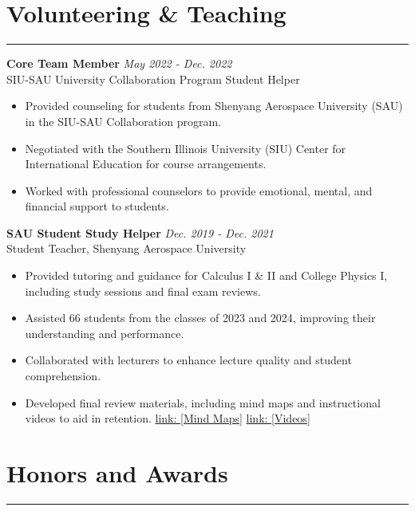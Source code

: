 \documentclass[11pt]{article}
\begin{document}
\section*{Volunteering \& Teaching}
\hrule

\noindent\textbf{Core Team Member} \hfill \textit{May 2022 - Dec. 2022} \\
SIU-SAU University Collaboration Program Student Helper
\begin{itemize}[leftmargin=*,itemsep=1pt]
    \item Provided counseling for students from Shenyang Aerospace University (SAU) in the SIU-SAU Collaboration program.
    \item Negotiated with the Southern Illinois University (SIU) Center for International Education for course arrangements.
    \item Worked with professional counselors to provide emotional, mental, and financial support to students.
\end{itemize}

\vspace{2mm}

\noindent \textbf{SAU Student Study Helper} \hfill \textit{Dec. 2019 - Dec. 2021} \\
Student Teacher, Shenyang Aerospace University 
\begin{itemize}[leftmargin=*,itemsep=1pt] 
    \item Provided tutoring and guidance for Calculus I \& II and College Physics I, including study sessions and final exam reviews.
    \item Assisted 66 students from the classes of 2023 and 2024, improving their understanding and performance.
    \item Collaborated with lecturers to enhance lecture quality and student comprehension.
    \item Developed final review materials, including mind maps and instructional videos to aid in retention.
    \href{https://zhbalex.github.io/knowledgetable.html}{link: [Mind Maps]}
    \href{ https://www.bilibili.com/video/BV1x5411b7tP/?share_source=copy_web&vd_source=e0cfc2571d8eeaec6f9f0598e6af3d9d}{link: [Videos]}
\end{itemize}

\section*{Honors and Awards}
\hrule

\vspace{3mm}
\end{document}
